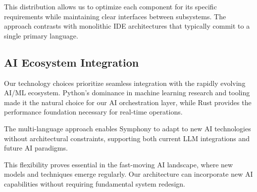 This distribution allows us to optimize each component for its specific requirements while maintaining clear interfaces between subsystems. The approach contrasts with monolithic IDE architectures that typically commit to a single primary language.

\subsection*{AI Ecosystem Integration}

Our technology choices prioritize seamless integration with the rapidly evolving AI/ML ecosystem. Python's dominance in machine learning research and tooling made it the natural choice for our AI orchestration layer, while Rust provides the performance foundation necessary for real-time operations.

\begin{successbox}
The multi-language approach enables Symphony to adapt to new AI technologies without architectural constraints, supporting both current LLM integrations and future AI paradigms.
\end{successbox}

This flexibility proves essential in the fast-moving AI landscape, where new models and techniques emerge regularly. Our architecture can incorporate new AI capabilities without requiring fundamental system redesign.
